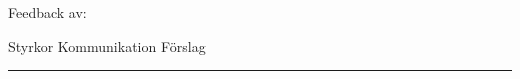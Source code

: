 \begin{questions}
\setlength\itemsep{2\baselineskip}



 





 

 





 

 

 
\newpage
\begin{center}
  Feedback av:\enspace\makebox[2in]{\hrulefill}\\
\end{center}

\smallskip
\noindent Styrkor \hfill Kommunikation \hfill Förslag \hrule


\end{questions}
